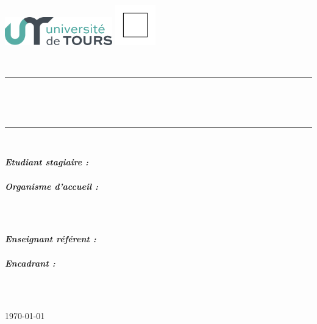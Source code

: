 \documentclass[11pt]{article}
\begin{document}
\begin{titlepage}
 \setlength{\wpYoffset}{-8.5cm}
 \setlength{\wpXoffset}{-1cm}
	\flushleft
	\includegraphics[width=0.35\textwidth]{logos/UnivTours4.png}
	\hfill
	\includegraphics[width=0.13\textwidth]{logos/Carre.png}\par\vspace{1cm}
	\centering
	{\scshape\LARGE \typedoc \par \etablissement \par}
	\vspace{1.5cm}
	{\scshape\Large \cursus \\ \filiere \par}
	\vspace{1cm}
 \rule{\linewidth}{0.2 mm} \\[0.4 cm]
	{\huge\bfseries \titre \par} \
 \rule{\linewidth}{0.2 mm} \\[1.5 cm]
	\vspace{0.5cm}
 
	\begin{minipage}{0.5\textwidth}
		\begin{flushleft} \large
		\emph{\textbf{Etudiant stagiaire :}}\\
  \etudiant \\
  \vspace{0.5cm}
  \emph{\textbf{Organisme d'accueil :}} \\
		 \organisme \\
		\end{flushleft}
	\end{minipage}
	~
	\begin{minipage}{0.45\textwidth}
		\begin{flushright} \large
		\emph{\textbf{Enseignant référent :}} \\
		 \enseignant \\
		 \vspace{0.5cm}
		\emph{\textbf{Encadrant :}} \\
		 \encadrant \\
		\end{flushright}
	\end{minipage}\\[1cm]
 
	\vfill
	{\LARGE \today \par}


\end{titlepage}
\end{document}
